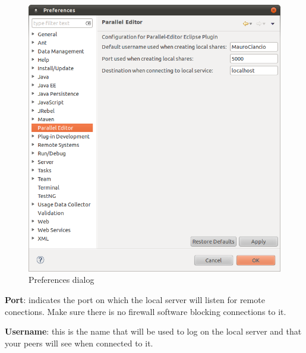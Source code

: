 \begin{figure}
	\begin{center}
		\includegraphics[width=12cm]{preferences.png}
		\caption{\label{preferencias} Preferences dialog}
	\end{center}
\end{figure}

\textbf{Port}: indicates the port on which the local server will listen for remote conections. Make sure
there is no firewall software blocking connections to it.

\textbf{Username}: this is the name that will be used to log on the local server and that your peers will
see when connected to it.

